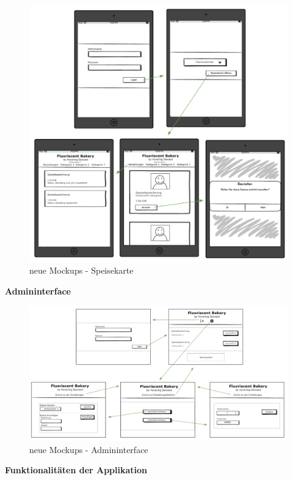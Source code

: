 			\begin{figure}[H]
			\begin{centering}
			\includegraphics[width = 1\textwidth]{Bilder/Jok_neue_mockups}
			\par\end{centering}
			\caption{neue Mockups - Speisekarte}
			\label{neue Mockups - Speisekarte}
			\end{figure}\textbf{Admininterface}\\
			\begin{figure}[H]
			\begin{centering}
			\includegraphics[width = 1\textwidth]{Bilder/Jok_neue_mockups_admin}
			\par\end{centering}
			\caption{neue Mockups - Admininterface}
			\label{neue Mockups - Admininterface}
			\end{figure}\textbf{Funktionalitäten der Applikation}\\
